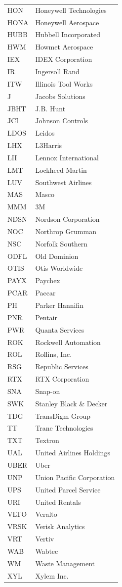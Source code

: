 \documentclass[11pt,a4paper]{article}
\begin{document}
{\begin{longtable}{lp{11cm}}
HON & Honeywell Technologies \\
HONA & Honeywell Aerospace \\
HUBB & Hubbell Incorporated \\
HWM & Howmet Aerospace \\
IEX & IDEX Corporation \\
IR & Ingersoll Rand \\
ITW & Illinois Tool Works \\
J & Jacobs Solutions \\
JBHT & J.B. Hunt \\
JCI & Johnson Controls \\
LDOS & Leidos \\
LHX & L3Harris \\
LII & Lennox International \\
LMT & Lockheed Martin \\
LUV & Southwest Airlines \\
MAS & Masco \\
MMM & 3M \\
NDSN & Nordson Corporation \\
NOC & Northrop Grumman \\
NSC & Norfolk Southern \\
ODFL & Old Dominion \\
OTIS & Otis Worldwide \\
PAYX & Paychex \\
PCAR & Paccar \\
PH & Parker Hannifin \\
PNR & Pentair \\
PWR & Quanta Services \\
ROK & Rockwell Automation \\
ROL & Rollins, Inc. \\
RSG & Republic Services \\
RTX & RTX Corporation \\
SNA & Snap-on \\
SWK & Stanley Black \& Decker \\
TDG & TransDigm Group \\
TT & Trane Technologies \\
TXT & Textron \\
UAL & United Airlines Holdings \\
UBER & Uber \\
UNP & Union Pacific Corporation \\
UPS & United Parcel Service \\
URI & United Rentals \\
VLTO & Veralto \\
VRSK & Verisk Analytics \\
VRT & Vertiv \\
WAB & Wabtec \\
WM & Waste Management \\
XYL & Xylem Inc. \\
\hline
\end{longtable}}
\end{document}
